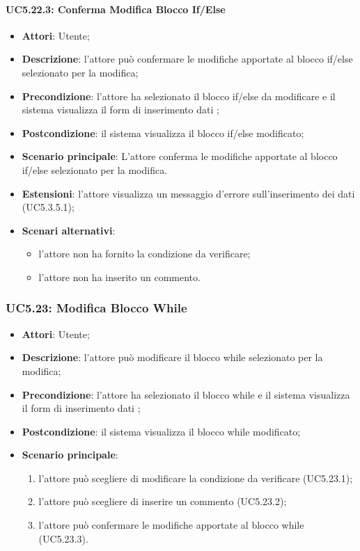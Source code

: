\begin{itemize}
\begin{itemize}
\begin{itemize}
\begin{itemize}
\paragraph{UC5.22.3: Conferma Modifica Blocco If/Else}
\label{UC5.22.3}
\begin{itemize}
	\item \textbf{Attori}: Utente;
	\item \textbf{Descrizione}: l'attore può confermare le modifiche apportate al blocco if/else selezionato per la modifica;
	\item \textbf{Precondizione}: l'attore ha selezionato il blocco if/else da modificare e il sistema visualizza il form di inserimento dati ;
	\item \textbf{Postcondizione}: il sistema visualizza il blocco if/else modificato;
	\item \textbf{Scenario principale}: L'attore conferma le modifiche apportate al blocco if/else selezionato per la modifica.
	\item \textbf{Estensioni}: l'attore visualizza un messaggio d'errore sull'inserimento dei dati (UC5.3.5.1);
	\item \textbf{Scenari alternativi}:
	\begin{itemize}
		\item l'attore non ha fornito la condizione da verificare;
		\item l'attore non ha inserito un commento.
	\end{itemize}
\end{itemize}

\subsubsection{UC5.23: Modifica Blocco While}
\label{UC5.23}
\begin{itemize}
	\item \textbf{Attori}: Utente;
	\item \textbf{Descrizione}: l'attore può modificare il blocco while selezionato per la modifica;
	\item \textbf{Precondizione}: l'attore ha selezionato il blocco while e il sistema visualizza il form di inserimento dati ;
	\item \textbf{Postcondizione}: il sistema visualizza il blocco while modificato;
	\item \textbf{Scenario principale}:
	\begin{enumerate}
		\item l'attore può scegliere di modificare la condizione da verificare (UC5.23.1);
		\item l'attore può scegliere di inserire un commento (UC5.23.2);
		\item l'attore può confermare le modifiche apportate al blocco while (UC5.23.3).
	\end{enumerate}
\end{itemize}


\end{itemize}
\end{itemize}
\end{itemize}
\end{itemize}
